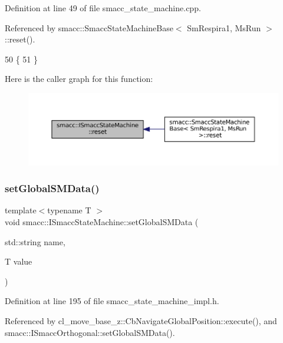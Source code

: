 Definition at line 49 of file smacc\+\_\+state\+\_\+machine.\+cpp.



Referenced by smacc\+::\+Smacc\+State\+Machine\+Base$<$ Sm\+Respira1, Ms\+Run $>$\+::reset().


\begin{DoxyCode}
50 \{
51 \}
\end{DoxyCode}
Here is the caller graph for this function\+:
\nopagebreak
\begin{figure}[H]
\begin{center}
\leavevmode
\includegraphics[width=350pt]{classsmacc_1_1ISmaccStateMachine_a9e4b4fe4dda962642397993235c6eea0_icgraph}
\end{center}
\end{figure}
\mbox{\label{classsmacc_1_1ISmaccStateMachine_a8588f9e580fbb95b53e2bd2ca3ff1f98}} 
\subsubsection{\texorpdfstring{set\+Global\+S\+M\+Data()}{setGlobalSMData()}}
{\footnotesize\ttfamily template$<$typename T $>$ \\
void smacc\+::\+I\+Smacc\+State\+Machine\+::set\+Global\+S\+M\+Data (\begin{DoxyParamCaption}\item[{std\+::string}]{name,  }\item[{T}]{value }\end{DoxyParamCaption})}



Definition at line 195 of file smacc\+\_\+state\+\_\+machine\+\_\+impl.\+h.



Referenced by cl\+\_\+move\+\_\+base\+\_\+z\+::\+Cb\+Navigate\+Global\+Position\+::execute(), and smacc\+::\+I\+Smacc\+Orthogonal\+::set\+Global\+S\+M\+Data().


